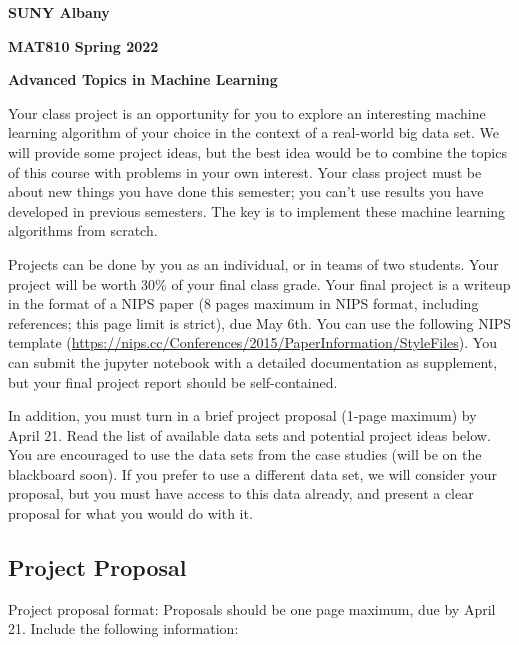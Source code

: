 \documentclass[a4paper,10pt]{article}
\begin{document}
\begin{center}

\textbf{SUNY Albany}

\textbf{MAT810 Spring 2022}

\textbf{Advanced Topics in Machine Learning}


\end{center}


Your class project is an opportunity for you to explore an interesting machine learning  algorithm of your choice in the context of a real-world big data set.  We will provide some project ideas, but the best idea would be to combine the topics of this course with problems in your own interest. Your class project must be about new things you have done this semester; you can't use results you have developed in previous semesters. The key is to implement these machine learning algorithms from
scratch.

Projects can be done by you as an individual, or in teams of two students. Your project will be worth 30\% of your final class grade. Your final project is a writeup in the format of a NIPS paper (8 pages maximum in NIPS format, including references; this page limit is strict), due May 6th. You can use the following NIPS template (\url{https://nips.cc/Conferences/2015/PaperInformation/StyleFiles}). You can submit the jupyter notebook with a detailed documentation as supplement, but your final project report should be self-contained. 

In addition, you must turn in a brief project proposal (1-page maximum) by April 21.  Read the list of available data sets and potential project ideas below.  You are encouraged to use the data sets from the case studies (will be on the blackboard soon). If you prefer to use a different data set, we will consider your proposal, but you must have access to this data already, and present a clear proposal for what you would do with it. 

\subsection*{Project Proposal}
Project proposal format:  Proposals should be one page maximum, due by April 21.
 Include the following information:
\end{document}
